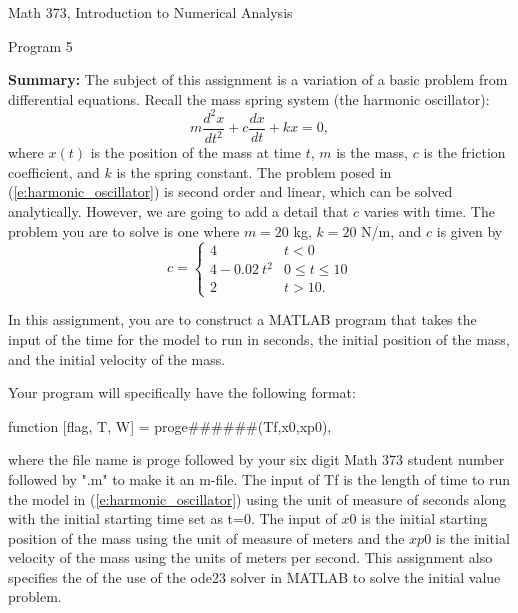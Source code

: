 \documentclass{article}
\begin{document}

\large

{\Large Math 373, Introduction to Numerical Analysis}


{\Large Program 5} \par \medskip \noindent
%
{\bf Summary:} The subject of this assignment is a variation of a basic problem from differential equations. Recall the mass spring system (the harmonic oscillator):
\begin{equation}
m\frac {d^2x}{dt^2} + c \frac {dx}{dt} + k x = 0,
\label{e:harmonic_oscillator}
\end{equation}
where $x(t)$ is the position of the mass at time $t$, $m$ is the mass, $c$ is the friction coefficient, and $k$ is the spring constant. The problem posed in (\ref{e:harmonic_oscillator}) is second order and linear, which can be solved analytically. However, we are going to add a detail that $c$ varies with time. The problem you are to solve is one where $m = 20$ kg, $k = 20$ N/m, and $c$ is given by
$$c = \begin{cases}
4 & t<0 \\
4 - 0.02\ t^2 & 0 \le t \le 10 \\
2 & t > 10.
\end{cases}
$$
\par \bigskip \par \noindent
In this assignment, you are to construct a MATLAB program that takes the input of the time for the model to run in seconds, the initial position of the mass, and the initial velocity of the mass. 

Your program will specifically have the following format: \par \medskip
function [flag, T, W] = proge\#\#\#\#\#\#(Tf,x0,xp0), \par \medskip \noindent
%
where the file name is proge followed by your six digit Math 373 student number  followed by ".m" to make it an m-file. The input of Tf is the length of time to run the model in (\ref{e:harmonic_oscillator}) using the unit of measure of seconds along with the initial starting time set as t=0. The input of $x0$ is the initial starting position of the mass using the unit of measure of meters and the $xp0$ is the initial velocity of the mass using the units of meters per second. This assignment also specifies the of the use of the ode23 solver in MATLAB to solve the initial value problem. 
\end{document}
